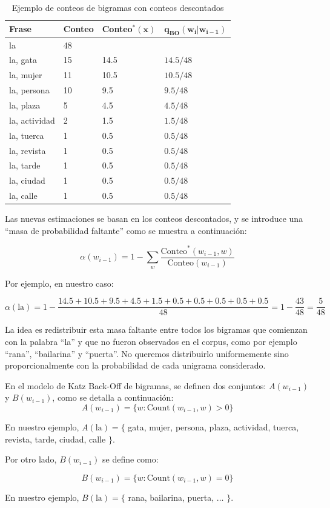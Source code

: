 \begin{table}[h]
    \centering
    \begin{tabular}{|l|l|l|l|}\hline
        \textbf{Frase} & \textbf{Conteo} & \textbf{Conteo}$\mathbf{^*(x)}$ & $\mathbf{q_{\text{BO}}(w_i | w_{i-1})}$ \\
        \hline
        la & 48 & & \\
        la, gata & 15 & 14.5 & $14.5/48$ \\
        la, mujer & 11 & 10.5 & $10.5/48$ \\
        la, persona & 10 & 9.5 & $9.5/48$ \\
        la, plaza & 5 & 4.5 & $4.5/48$ \\
        la, actividad & 2 & 1.5 & $1.5/48$ \\
        la, tuerca & 1 & 0.5 & $0.5/48$ \\
        la, revista & 1 & 0.5 & $0.5/48$ \\
        la, tarde & 1 & 0.5 & $0.5/48$ \\
        la, ciudad & 1 & 0.5 & $0.5/48$ \\
        la, calle & 1 & 0.5 & $0.5/48$ \\\hline
    \end{tabular}\caption{Ejemplo de conteos de bigramas con conteos descontados}\label{tab:plm_ej}
\end{table}

Las nuevas estimaciones se basan en los conteos descontados, y se introduce una ``masa de probabilidad faltante'' como se muestra a continuación:

\begin{definition}
\[
\alpha(w_{i-1}) = 1 - \sum_{w} \frac{\text{Conteo}^*(w_{i-1}, w)}{\text{Conteo}(w_{i-1})}
\]
\end{definition}


Por ejemplo, en nuestro caso:

\[
\alpha(\text{la}) = 1 - \frac{14.5+10.5+9.5+4.5+1.5+0.5+0.5+0.5+0.5+0.5}{48} = 1-\frac{43}{48} = \frac{5}{48}
\]

La idea es redistribuir esta masa faltante entre todos los bigramas que comienzan con la palabra ``la'' y que no fueron observados en el corpus, como por ejemplo ``rana'', ``bailarina'' y ``puerta''. No queremos distribuirlo uniformemente sino proporcionalmente con la probabilidad de cada unigrama considerado.



\begin{definition}
En el modelo de Katz Back-Off de bigramas, se definen dos conjuntos: $A(w_{i-1})$ y $B(w_{i-1})$, como se detalla a continuación:
\[
A(w_{i-1}) = \{w : \text{Count}(w_{i-1}, w) > 0\}
\] 

En nuestro ejemplo, $A(\text{la}) = \{$ gata, mujer, persona, plaza, actividad, tuerca, revista, tarde, ciudad, calle $\}$.

Por otro lado, $B(w_{i-1})$ se define como:

\[
B(w_{i-1}) = \{w : \text{Count}(w_{i-1}, w) = 0\}
\] 


En nuestro ejemplo, $B(\text{la}) = \{$ rana, bailarina, puerta, $\dots$ $\}$.

\end{definition}



